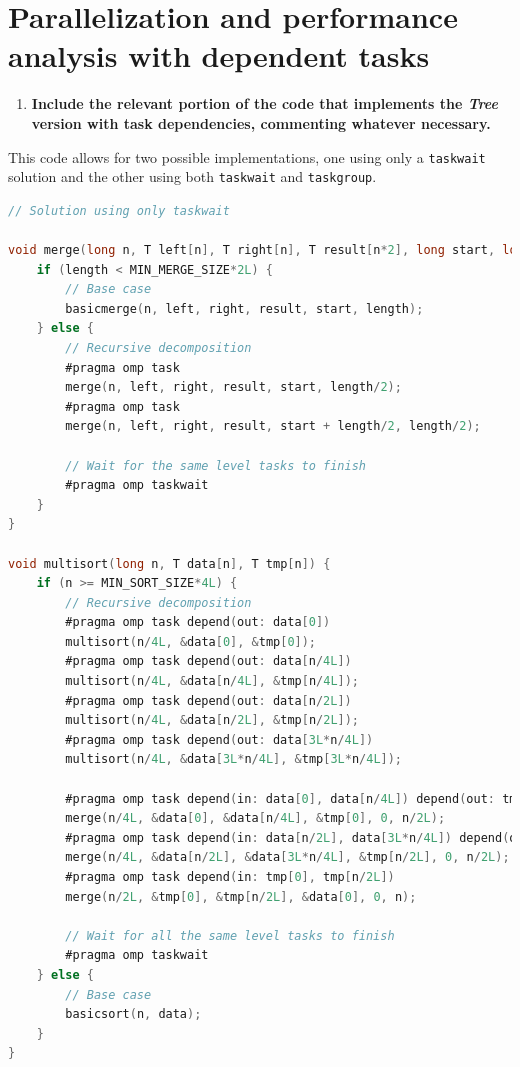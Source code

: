 \documentclass[a4paper]{article}
\newenvironment{questionenum}{%
\setlist[enumerate]{resume}
\restartlist{enumerate}
\newcommand{\question}[1]{
\begin{enumerate}
	\item\bfseries ##1
\end{enumerate}
}}{%
}
\begin{document}
\section{Parallelization and performance analysis with dependent tasks}
\begin{questionenum}
	\question{Include the relevant portion of the code that implements the \textit{Tree} version with task dependencies, commenting whatever necessary.}
    
    This code allows for two possible implementations, one using only a \texttt{taskwait} solution and the other using both \texttt{taskwait} and \texttt{taskgroup}.
    
    \begin{lstlisting}[language=C, title=\texttt{multisort-omp-tree-dep-taskwait.c}]
// Solution using only taskwait

void merge(long n, T left[n], T right[n], T result[n*2], long start, long length) {
    if (length < MIN_MERGE_SIZE*2L) {
        // Base case
        basicmerge(n, left, right, result, start, length);
    } else {
        // Recursive decomposition
        #pragma omp task
        merge(n, left, right, result, start, length/2);
        #pragma omp task
        merge(n, left, right, result, start + length/2, length/2);
        
        // Wait for the same level tasks to finish
        #pragma omp taskwait
    }
}

void multisort(long n, T data[n], T tmp[n]) {
    if (n >= MIN_SORT_SIZE*4L) {
        // Recursive decomposition
        #pragma omp task depend(out: data[0])
        multisort(n/4L, &data[0], &tmp[0]);
        #pragma omp task depend(out: data[n/4L])
        multisort(n/4L, &data[n/4L], &tmp[n/4L]);
        #pragma omp task depend(out: data[n/2L])
        multisort(n/4L, &data[n/2L], &tmp[n/2L]);
        #pragma omp task depend(out: data[3L*n/4L])
        multisort(n/4L, &data[3L*n/4L], &tmp[3L*n/4L]);
        
        #pragma omp task depend(in: data[0], data[n/4L]) depend(out: tmp[0])
        merge(n/4L, &data[0], &data[n/4L], &tmp[0], 0, n/2L);
        #pragma omp task depend(in: data[n/2L], data[3L*n/4L]) depend(out: tmp[n/2L])
        merge(n/4L, &data[n/2L], &data[3L*n/4L], &tmp[n/2L], 0, n/2L);
        #pragma omp task depend(in: tmp[0], tmp[n/2L])
        merge(n/2L, &tmp[0], &tmp[n/2L], &data[0], 0, n);
        
        // Wait for all the same level tasks to finish
        #pragma omp taskwait
    } else {
        // Base case
        basicsort(n, data);
    }
}


\end{lstlisting}
\end{questionenum}
\end{document}
